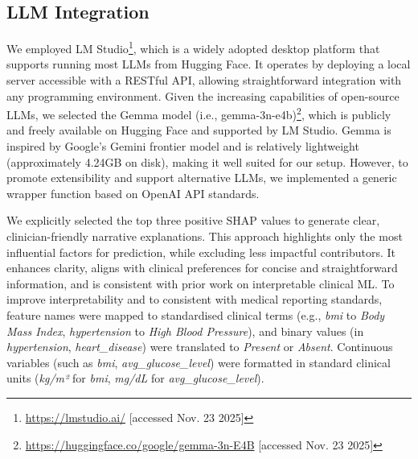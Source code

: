 \subsection{LLM Integration}
We employed LM Studio\footnote{\url{https://lmstudio.ai/} [accessed Nov. 23 2025]}, which is a widely adopted desktop platform that supports running most LLMs from Hugging Face. It operates by deploying a local server accessible with a RESTful API, allowing straightforward integration with any programming environment. Given the increasing capabilities of open-source LLMs, we selected the Gemma model (i.e., gemma-3n-e4b)\footnote{\url{https://huggingface.co/google/gemma-3n-E4B} [accessed Nov. 23 2025]}, which is publicly and freely available on Hugging Face and supported by LM Studio. Gemma is inspired by Google's Gemini frontier model and is relatively lightweight  (approximately 4.24GB on disk), making it well suited for our setup. However, to promote extensibility and support alternative LLMs, we implemented a generic wrapper function based on OpenAI API standards.

\medskip
We explicitly selected the top three positive SHAP values to generate clear, clinician-friendly narrative explanations. This approach highlights only the most influential factors for prediction, while excluding less impactful contributors. It enhances clarity, aligns with clinical preferences for concise and straightforward information, and is consistent with prior work on interpretable clinical ML. To improve interpretability and to consistent with medical reporting standards, feature names were mapped to standardised clinical terms (e.g., \textit{bmi} to \textit{Body Mass Index}, \textit{hypertension} to \textit{High Blood Pressure}), and binary values (in  \textit{hypertension}, \textit{heart\_disease}) were translated to \textit{Present} or \textit{Absent}. Continuous variables (such as \textit{bmi}, \textit{avg\_glucose\_level}) were formatted in standard clinical units (\textit{kg/m²} for \textit{bmi}, \textit{mg/dL} for \textit{avg\_glucose\_level}).

